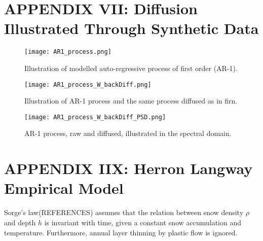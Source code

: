 \documentclass[../../CompleteThesis2/Complete_2ndDraft.tex]{subfiles}
\begin{document}
	
	\newpage
	\section[Appendix VII: Synthetic Diffusion]{APPENDIX VII: Diffusion Illustrated Through Synthetic Data}
	\label{AppVII:SignalAnalysis_SyntheticData}
	\begin{figure}[h]
		\centering
		\texttt{[image: AR1\_process.png]}
		\caption[Illustration of AR-1 process.]{\small Illustration of modelled auto-regressive process of first order (AR-1).}
		\label{fig:AR1_process}
	\end{figure}
	
	\begin{figure}[h]
		\centering
		\texttt{[image: AR1\_process\_W\_backDiff.png]}
		\caption[AR-1 process with diffusion.]{\small Illustration of AR-1 process and the same process diffused as in firn.}
		\label{fig:AR1_process_W_backDiff}
	\end{figure}
	
	\begin{figure}[h]
		\centering
		\texttt{[image: AR1\_process\_W\_backDiff\_PSD.png]}
		\caption[AR-1 process in the spectral domain, raw and diffused.]{\small AR-1 process, raw and diffused, illustrated in the spectral domain.}
		\label{fig:AR1_process_W_backDiff_PSD}
	\end{figure}




	\newpage
	\section[Appendix IIX: HL Empirical Model]{APPENDIX IIX: Herron Langway Empirical Model}
	\label{AppIIX:HLmodel}
	
	
	Sorge's law(REFERENCES) assumes that the relation between snow density $\rho$ and depth $h$ is invariant with time, given a constant snow accumulation and temperature. Furthermore, annual layer thinning by plastic flow is ignored.
	
\end{document}
